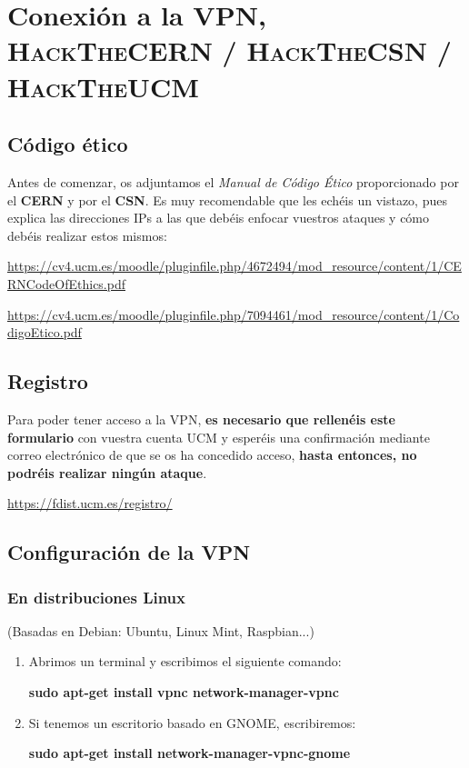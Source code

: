 \newpage
\section{Conexión a la VPN, \textsc{HackTheCERN / HackTheCSN / HackTheUCM}}
\subsection{Código ético}
Antes de comenzar, os adjuntamos el \textit{Manual de Código Ético} proporcionado por el \textbf{CERN} y por el \textbf{CSN}. Es muy recomendable que les echéis un vistazo, pues explica las direcciones IPs a las que debéis enfocar vuestros ataques y cómo debéis realizar estos mismos:
\begin{tcolorbox}
    \url{https://cv4.ucm.es/moodle/pluginfile.php/4672494/mod_resource/content/1/CERNCodeOfEthics.pdf}
\end{tcolorbox} 

\begin{tcolorbox}
    \url{https://cv4.ucm.es/moodle/pluginfile.php/7094461/mod_resource/content/1/CodigoEtico.pdf}
\end{tcolorbox} 

\subsection{Registro}
Para poder tener acceso a la VPN, \textbf{es necesario que rellenéis este formulario} con vuestra cuenta UCM y esperéis una confirmación mediante correo electrónico de que se os ha concedido acceso, \textbf{hasta entonces, no podréis realizar ningún ataque}.
\begin{tcolorbox}
    \url{https://fdist.ucm.es/registro/}
\end{tcolorbox}

\subsection{Configuración de la VPN}
\subsubsection{En distribuciones Linux} 
\begin{tcolorbox}[colframe=black!75!blue]
\begin{center}
    (Basadas en Debian: Ubuntu, Linux Mint, Raspbian...)
\end{center}
\end{tcolorbox}
\begin{enumerate}
    \item Abrimos un terminal y escribimos el siguiente comando: 
        \begin{center}
         \textbf{sudo apt-get install vpnc network-manager-vpnc} 
        \end{center}
        \item Si tenemos un escritorio basado en GNOME, escribiremos: 
        \begin{center}
         \textbf{sudo apt-get install network-manager-vpnc-gnome}
        \end{center}
\end{enumerate}

